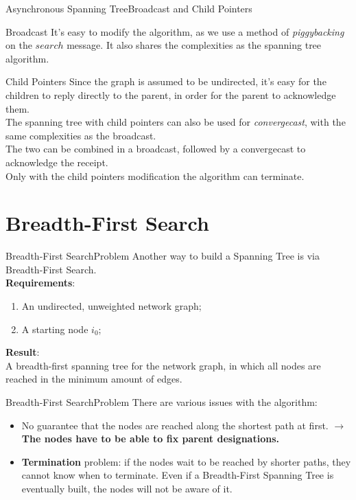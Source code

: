 \documentclass[pdf]{beamer}
\begin{document}
\begin{frame}{Asynchronous Spanning Tree}{Broadcast and Child Pointers}
    \begin{block}{Broadcast}
        It's easy to modify the algorithm, as we use a method of \emph{piggybacking} on the
        $search$ message. It also shares the complexities as the spanning tree algorithm.
    \end{block}
    \begin{block}{Child Pointers}
        Since the graph is assumed to be undirected, it's easy for the children to reply
        directly to the parent, in order for the parent to acknowledge them.\\
        The spanning tree with child pointers can also be used for \emph{convergecast}, with the same complexities as the broadcast.\\
        The two can be combined in a broadcast, followed by a convergecast to acknowledge the receipt.\\
        Only with the child pointers modification the algorithm can terminate.
    \end{block}
\end{frame}

\section{Breadth-First Search}
\begin{frame}{Breadth-First Search}{Problem}
	Another way to build a Spanning Tree is via Breadth-First Search. \\
    \vspace{12pt}
    \pause
    \textbf{Requirements}:
    \begin{enumerate}
        \item An undirected, unweighted network graph; \pause
        \item A starting node $i_0$; \pause
    \end{enumerate}
    \vspace{12pt}
    \textbf{Result}: \\ \pause
    A breadth-first spanning tree for the network graph, in which all nodes are reached in the minimum amount of edges.
\end{frame}

\begin{frame}{Breadth-First Search}{Problem}
    There are various issues with the algorithm: \pause
    \begin{itemize}
        \item No guarantee that the nodes are reached along the shortest path at first. \pause $\to$ \textbf{The nodes have to be able to fix parent designations.} \pause
        \item \textbf{Termination} problem: if the nodes wait to be reached by shorter paths, they cannot know when to terminate. Even if a Breadth-First Spanning Tree is eventually built, the nodes will not be aware of it.
    \end{itemize}
\end{frame}
\end{document}
